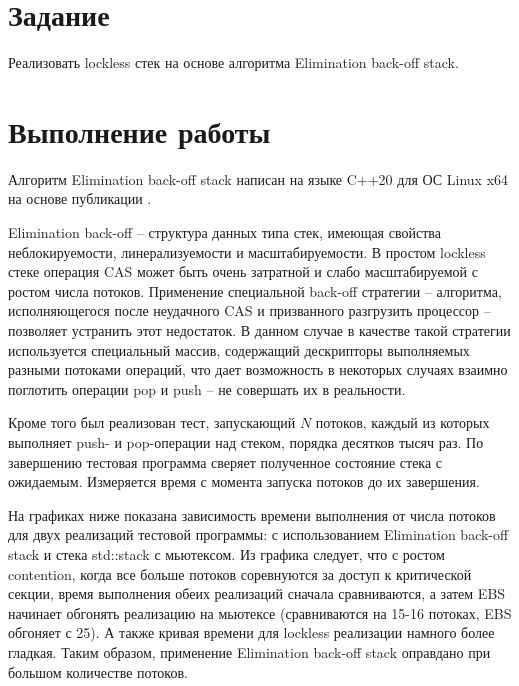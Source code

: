 \documentclass[a4paper,14pt]{extarticle}
\begin{document}


\renewcommand*{\thepage}{}
\tableofcontents
\clearpage
\renewcommand*{\thepage}{\arabic{page}}

\setcounter{page}{3}

\section{Задание}

Реализовать lockless стек на основе алгоритма Elimination back-off stack.

\section{Выполнение работы}

Алгоритм Elimination back-off stack написан на языке C++20 для ОС Linux x64 на
основе публикации \cite{hendler04}.

Elimination back-off -- структура данных типа стек, имеющая свойства
неблокируемости, линерализуемости и масштабируемости. В простом lockless стеке
операция CAS может быть очень затратной и слабо масштабируемой с ростом числа
потоков. Применение специальной back-off стратегии -- алгоритма, исполняющегося после
неудачного CAS и призванного разгрузить процессор -- позволяет устранить этот
недостаток. В данном случае в качестве такой стратегии используется специальный
массив, содержащий дескрипторы выполняемых разными потоками операций, что дает
возможность в некоторых случаях взаимно поглотить операции pop и push -- не
совершать их в реальности.

Кроме того был реализован тест, запускающий $N$ потоков, каждый из которых
выполняет push- и pop-операции над стеком, порядка десятков тысяч раз. По
завершению тестовая программа сверяет полученное состояние стека с ожидаемым.
Измеряется время с момента запуска потоков до их завершения.

На графиках ниже показана зависимость времени выполнения от числа потоков для
двух реализаций тестовой программы: с использованием Elimination back-off stack
и стека std::stack с мьютексом. Из графика следует, что с ростом contention,
когда все больше потоков соревнуются за доступ к критической секции, время
выполнения обеих реализаций сначала сравниваются, а затем EBS начинает обгонять
реализацию на мьютексе (сравниваются на 15-16 потоках, EBS обгоняет с 25). А
также кривая времени для lockless реализации намного более гладкая.
Таким образом, применение Elimination back-off stack оправдано при большом
количестве потоков.
\end{document}

